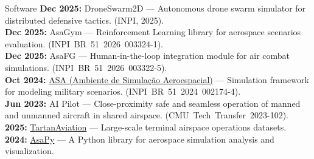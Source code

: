 \documentclass{resume} %
\newcommand{\certlink}[1]{\nolinebreak\,\href{#1}{\footnotesize\faCertificate}}
\newcommand{\ghlink}[1]{\nolinebreak\,\href{#1}{\footnotesize\faGithub}}
\newcommand{\weblink}[1]{\nolinebreak\,\href{#1}{\footnotesize\faGlobe}}
\begin{document}
\begin{rSection}{Software}
\footnotesize
\textbf{Dec 2025:} DroneSwarm2D --- Autonomous drone swarm simulator for distributed defensive tactics. (INPI, 2025).
\ghlink{https://github.com/lucasll37/DroneSwarm2D-lib}\\
\textbf{Dec 2025:} AsaGym --- Reinforcement Learning library for aerospace scenarios evaluation. \mbox{(INPI BR 51 2026 003324-1).}
\certlink{https://www.joaopadantas.com/certificates/2026_AsaGym_Software_Registry.pdf}
\ghlink{https://github.com/ASA-Simulation/asa-gym}\\
\textbf{Dec 2025:} AsaFG --- Human-in-the-loop integration module for air combat simulations. \mbox{(INPI BR 51 2026 003322-5).}
\certlink{https://www.joaopadantas.com/certificates/2026_AsaFG_Software_Registry.pdf}
\ghlink{https://github.com/ASA-Simulation/AsaFG}\\
\textbf{Oct 2024:} \href{https://www.asa.dcta.mil.br/}{ASA (Ambiente de Simulação Aeroespacial)} --- Simulation framework for modeling military scenarios. \mbox{(INPI BR 51 2024 002174-4).}
\certlink{https://www.joaopadantas.com/certificates/2024_ASA_Software_Registry.pdf}
\weblink{https://www.asa.dcta.mil.br/}\\
\textbf{Jun 2023:} AI Pilot --- Close-proximity safe and seamless operation of manned and unmanned aircraft in shared airspace. \mbox{(CMU Tech Transfer 2023-102).}
\certlink{https://www.joaopadantas.com/certificates/2023_CMU_AIPilot_Software_Registry.pdf}\\
\textbf{2025:} \href{https://github.com/castacks/TartanAviation.git}{TartanAviation} --- Large-scale terminal airspace operations datasets.
\ghlink{https://github.com/castacks/TartanAviation.git}
\weblink{https://theairlab.org/aitf/}\\
\textbf{2024:} \href{https://github.com/ASA-Simulation/AsaPy}{AsaPy} --- A Python library for aerospace simulation analysis and visualization.
\ghlink{https://github.com/ASA-Simulation/AsaPy}
\end{rSection}

\end{document}
